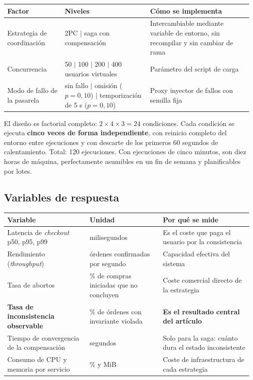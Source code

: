 \documentclass[11pt,a4paper]{article}
\begin{document}
\begin{center}
	\small
	\begin{tabular}{@{}p{3.6cm}p{4.4cm}p{7.0cm}@{}}
		\toprule
		\textbf{Factor} & \textbf{Niveles} & \textbf{Cómo se implementa} \\
		\midrule
		Estrategia de coordinación & 2PC $\mid$ saga con compensación & Intercambiable mediante variable de entorno, sin recompilar y sin cambiar de rama \\
		\addlinespace
		Concurrencia & 50 $\mid$ 100 $\mid$ 200 $\mid$ 400 usuarios virtuales & Parámetro del script de carga \\
		\addlinespace
		Modo de fallo de la pasarela & sin fallo $\mid$ omisión ($p=0{,}10$) $\mid$ temporización de 5 s ($p=0{,}10$) & Proxy inyector de fallos con semilla fija \\
		\bottomrule
	\end{tabular}
\end{center}

El diseño es factorial completo: $2 \times 4 \times 3 = 24$ condiciones. Cada condición se ejecuta \textbf{cinco veces de forma independiente}, con reinicio completo del entorno entre ejecuciones y con descarte de los primeros 60 segundos de calentamiento. Total: 120 ejecuciones. Con ejecuciones de cinco minutos, son diez horas de máquina, perfectamente asumibles en un fin de semana y planificables por lotes.

\subsection{Variables de respuesta}

\begin{center}
	\small
	\begin{tabular}{@{}p{4.6cm}p{4.0cm}p{6.4cm}@{}}
		\toprule
		\textbf{Variable} & \textbf{Unidad} & \textbf{Por qué se mide} \\
		\midrule
		Latencia de \emph{checkout} p50, p95, p99 & milisegundos & Es el coste que paga el usuario por la consistencia \\
		\addlinespace
		Rendimiento (\emph{throughput}) & órdenes confirmadas por segundo & Capacidad efectiva del sistema \\
		\addlinespace
		Tasa de abortos & \% de compras iniciadas que no concluyen & Coste comercial directo de la estrategia \\
		\addlinespace
		\textbf{Tasa de inconsistencia observable} & \% de órdenes con invariante violada & \textbf{Es el resultado central del artículo} \\
		\addlinespace
		Tiempo de convergencia de la compensación & segundos & Solo para la saga: cuánto dura el estado inconsistente \\
		\addlinespace
		Consumo de CPU y memoria por servicio & \% y MiB & Coste de infraestructura de cada estrategia \\
		\bottomrule
	\end{tabular}
\end{center}
\end{document}

